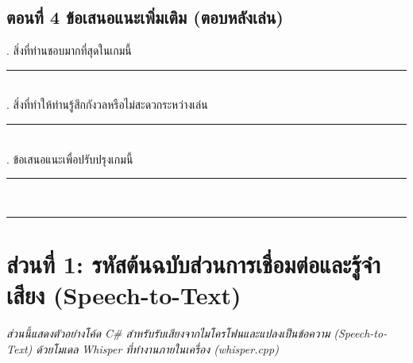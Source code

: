 \subsection*{ตอนที่ 4 ข้อเสนอแนะเพิ่มเติม (ตอบหลังเล่น)}
. สิ่งที่ท่านชอบมากที่สุดในเกมนี้

\noindent\rule{\textwidth}{0.4pt}\\[0.5cm]
. สิ่งที่ทำให้ท่านรู้สึกกังวลหรือไม่สะดวกระหว่างเล่น

\noindent\rule{\textwidth}{0.4pt}\\[0.5cm]
. ข้อเสนอแนะเพื่อปรับปรุงเกมนี้

\noindent\rule{\textwidth}{0.4pt}\\[0.5cm]
\noindent\rule{\textwidth}{0.4pt}


\section*{ส่วนที่ 1: รหัสต้นฉบับส่วนการเชื่อมต่อและรู้จำเสียง (Speech-to-Text)}
\textit{ส่วนนี้แสดงตัวอย่างโค้ด C\# สำหรับรับเสียงจากไมโครโฟนและแปลงเป็นข้อความ (Speech-to-Text) ด้วยโมเดล Whisper ที่ทำงานภายในเครื่อง (whisper.cpp)}


